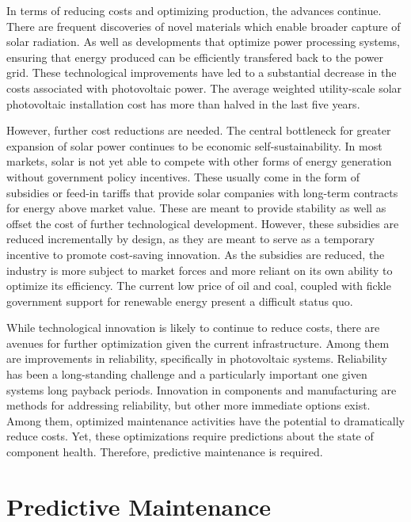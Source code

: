 In terms of reducing costs and optimizing production, the advances continue. There are frequent discoveries of novel materials which enable broader capture of solar radiation\cite{Anguita2016}. As well as developments that optimize power processing systems, ensuring that energy produced can be efficiently transfered back to the power grid\cite{Weckx2014}. These technological improvements have led to a substantial decrease in the costs associated with photovoltaic power. The average weighted utility-scale solar photovoltaic installation cost has more than halved in the last five years\cite{IRENA2016}.

However, further cost reductions are needed. The central bottleneck for greater expansion of solar power continues to be economic self-sustainability. In most markets, solar is not yet able to compete with other forms of energy generation without  government policy incentives\cite{OECD2011}. These usually come in the form of subsidies or feed-in tariffs that provide solar companies with long-term contracts for energy above market value. These are meant to provide stability as well as offset the cost of further technological development\cite{Couture2010}. However, these subsidies are reduced incrementally by design, as they are meant to serve as a temporary incentive to promote cost-saving innovation. As the subsidies are reduced, the industry is more subject to market forces and more reliant on its own ability to optimize its efficiency. The current low price of oil and coal, coupled with fickle government support for renewable energy\cite{FrankfurtSchool2016} present a difficult status quo\cite{Hals2016}. 

While technological innovation is likely to continue to reduce costs, there are avenues for further optimization given the current infrastructure. Among them are improvements in reliability, specifically in photovoltaic systems. Reliability has been a long-standing challenge\cite{Petrone2008} and a particularly important one given systems long payback periods\cite{Moore2008}. Innovation in components and manufacturing are methods for addressing reliability, but other more immediate options exist. Among them, optimized maintenance activities have the potential to dramatically reduce costs. Yet, these optimizations require predictions about the state of component health. Therefore, predictive maintenance is required.

\section*{Predictive Maintenance}

